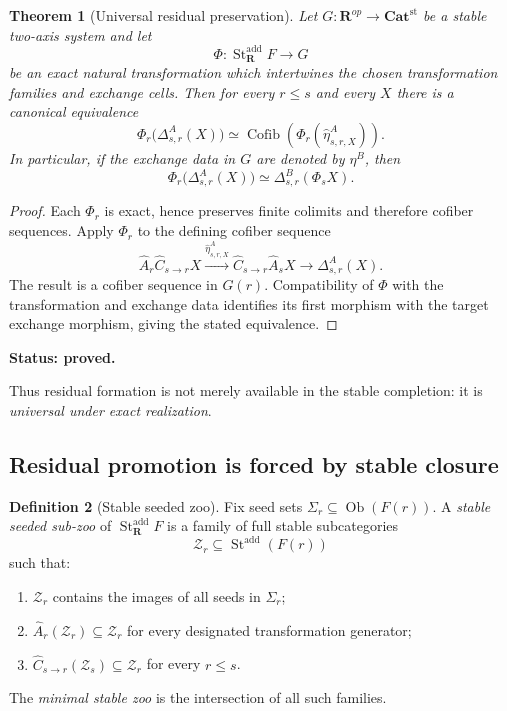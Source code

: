 \documentclass[11pt]{article}
\newtheorem{theorem}{Theorem}[section]
\theoremstyle{definition}
\newtheorem{definition}[theorem]{Definition}
\theoremstyle{remark}
\newcommand{\Rcat}{\mathbf R}
\newcommand{\Ob}{\operatorname{Ob}}
\newcommand{\Cofib}{\operatorname{Cofib}}
\newcommand{\Seeds}{\Sigma}
\newcommand{\status}[1]{\textbf{Status: #1.}}
\begin{document}
\begin{theorem}[Universal residual preservation]\label{thm:residual-preservation}
Let $G:\Rcat^{op}\to\mathbf{Cat}^{\mathrm{st}}$ be a stable two-axis system and let
\[
\Phi:\operatorname{St}^{\mathrm{add}}_{\Rcat}F\longrightarrow G
\]
be an exact natural transformation which intertwines the chosen transformation families and exchange cells. Then for every $r\le s$ and every $X$ there is a canonical equivalence
\[
\Phi_r\bigl(\Delta^A_{s,r}(X)\bigr)
\simeq
\Cofib\!\left(
\Phi_r(\widehat\eta^A_{s,r,X})
\right).
\]
In particular, if the exchange data in $G$ are denoted by $\eta^B$, then
\[
\Phi_r\bigl(\Delta^A_{s,r}(X)\bigr)
\simeq
\Delta^B_{s,r}(\Phi_sX).
\]
\end{theorem}

\begin{proof}
Each $\Phi_r$ is exact, hence preserves finite colimits and therefore cofiber sequences. Apply $\Phi_r$ to the defining cofiber sequence
\[
\widehat A_r\widehat C_{s\to r}X
\xrightarrow{\widehat\eta^A_{s,r,X}}
\widehat C_{s\to r}\widehat A_sX
\longrightarrow
\Delta^A_{s,r}(X).
\]
The result is a cofiber sequence in $G(r)$. Compatibility of $\Phi$ with the transformation and exchange data identifies its first morphism with the target exchange morphism, giving the stated equivalence.
\end{proof}

\status{proved}

Thus residual formation is not merely available in the stable completion: it is \emph{universal under exact realization}.

\subsection{Residual promotion is forced by stable closure}

\begin{definition}[Stable seeded zoo]
Fix seed sets $\Seeds_r\subseteq\Ob(F(r))$. A \emph{stable seeded sub-zoo} of $\operatorname{St}^{\mathrm{add}}_{\Rcat}F$ is a family of full stable subcategories
\[
\mathcal Z_r\subseteq\operatorname{St}^{\mathrm{add}}(F(r))
\]
such that:
\begin{enumerate}
    \item $\mathcal Z_r$ contains the images of all seeds in $\Seeds_r$;
    \item $\widehat A_r(\mathcal Z_r)\subseteq\mathcal Z_r$ for every designated transformation generator;
    \item $\widehat C_{s\to r}(\mathcal Z_s)\subseteq\mathcal Z_r$ for every $r\le s$.
\end{enumerate}
The \emph{minimal stable zoo} is the intersection of all such families.
\end{definition}
\end{document}
